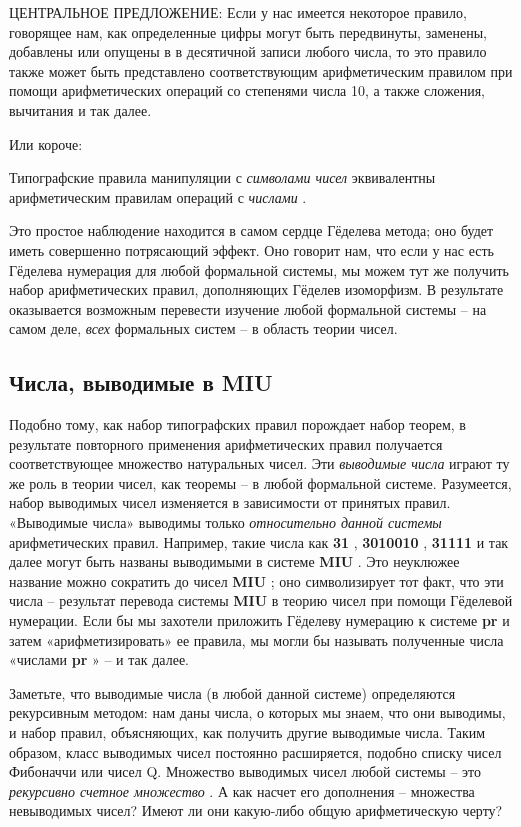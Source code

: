 \documentclass[../main.tex]{subfiles}
\begin{document}
ЦЕНТРАЛЬНОЕ ПРЕДЛОЖЕНИЕ: Если у нас имеется некоторое правило, говорящее нам, как определенные цифры могут быть передвинуты, заменены, добавлены или опущены в в десятичной записи любого числа, то это правило также может быть представлено соответствующим арифметическим правилом при помощи арифметических операций со степенями числа 10, а также сложения, вычитания и так далее.

Или короче:

Типографские правила манипуляции с \emph{символами чисел} эквивалентны арифметическим правилам операций с \emph{числами} .

Это простое наблюдение находится в самом сердце Гёделева метода; оно будет иметь совершенно потрясающий эффект. Оно говорит нам, что если у нас есть Гёделева нумерация для любой формальной системы, мы можем тут же получить набор арифметических правил, дополняющих Гёделев изоморфизм. В результате оказывается возможным перевести изучение любой формальной системы \--- на самом деле, \emph{всех} формальных систем \--- в область теории чисел.


\subsection{Числа, выводимые в MIU}

Подобно тому, как набор типографских правил порождает набор теорем, в результате повторного применения арифметических правил получается соответствующее множество натуральных чисел. Эти \emph{выводимые числа} играют ту же роль в теории чисел, как теоремы \--- в любой формальной системе. Разумеется, набор выводимых чисел изменяется в зависимости от принятых правил. «Выводимые числа» выводимы только \emph{относительно данной системы} арифметических правил. Например, такие числа как \textbf{31} , \textbf{3010010} , \textbf{31111} и так далее могут быть названы выводимыми в системе \textbf{MIU} . Это неуклюжее название можно сократить до чисел \textbf{MIU} ; оно символизирует тот факт, что эти числа \--- результат перевода системы \textbf{MIU} в теорию чисел при помощи Гёделевой нумерации. Если бы мы захотели приложить Гёделеву нумерацию к системе \textbf{pr} и затем «арифметизировать» ее правила, мы могли бы называть полученные числа «числами \textbf{pr} » \--- и так далее.

Заметьте, что выводимые числа (в любой данной системе) определяются рекурсивным методом: нам даны числа, о которых мы знаем, что они выводимы, и набор правил, объясняющих, как получить другие выводимые числа. Таким образом, класс выводимых чисел постоянно расширяется, подобно списку чисел Фибоначчи или чисел Q. Множество выводимых чисел любой системы \--- это \emph{рекурсивно счетное множество} . А как насчет его дополнения \--- множества невыводимых чисел? Имеют ли они какую-либо общую арифметическую черту?
\end{document}
